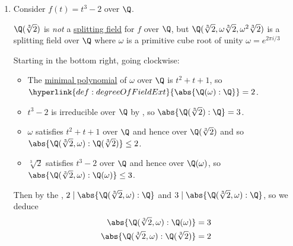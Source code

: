 \documentclass{article}
\begin{document}
\begin{eg}
    \leavevmode
    \begin{enumerate}
        \item Consider $f(t) = t^3 - 2$ over $\Q$.

            $\Q(\sqrt[3]{2})$ is \emph{not} a \hyperlink{def:splitting}{splitting field} for $f$ over $\Q$, but $\Q(\sqrt[3]{2}, \omega\sqrt[3]{2}, \omega^2\sqrt[3]{2})$ is a splitting field over $\Q$ where $\omega$ is a primitive cube root of unity $\omega = e^{2\pi i/3}$
            \begin{center}
            \end{center}

            Starting in the bottom right, going clockwise:
            \begin{itemize}
                \item The \hyperlink{def:minimalPoly}{minimal polynomial} of $\omega$ over $\Q$ is $t^2 + t + 1$, so $\hyperlink{def:degreeOfFieldExt}{\abs{\Q(\omega):\Q}}=2$.
                \item $t^3 - 2$ is irreducible over $\Q$ by , so $\abs{\Q(\sqrt[3]{2}):\Q}=3$.
                \item $\omega$ satisfies $t^2 + t + 1$ over $\Q$ and hence over $\Q(\sqrt[3]{2})$ and so $\abs{\Q(\sqrt[3]{2}, \omega):\Q(\sqrt[3]{2})} \leq 2$.
                \item $\sqrt[3]{2}$ satisfies $t^3 - 2$ over $\Q$ and hence over $\Q(\omega)$, so $\abs{\Q(\sqrt[3]{2}, \omega):\Q(\omega)} \leq 3$.
            \end{itemize}

            Then by the , $2 \mid \abs{\Q(\sqrt[3]{2}, \omega): \Q}$ and $3 \mid \abs{\Q(\sqrt[3]{2}, \omega): \Q}$, so we deduce
            \begin{align*}
                \abs{\Q(\sqrt[3]{2}, \omega) : \Q(\omega)} = 3 \\
                \abs{\Q(\sqrt[3]{2}, \omega) : \Q(\sqrt[3]{2})} = 2
            \end{align*}


\end{enumerate}
\end{eg}
\end{document}
